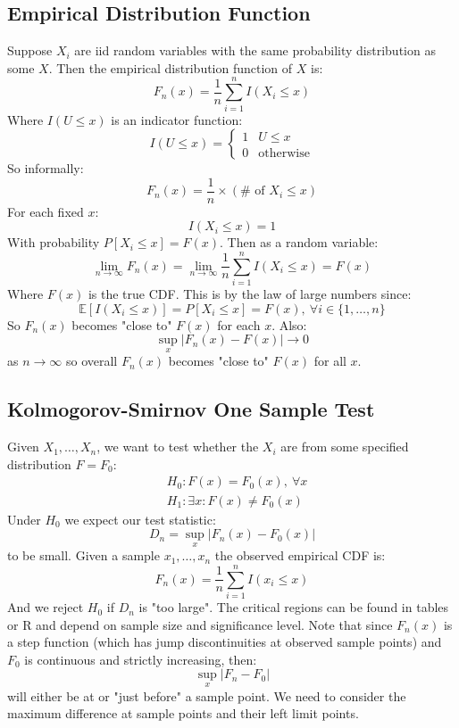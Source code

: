 \documentclass[12pt]{article}
\begin{document}
\subsection{Empirical Distribution Function}
Suppose \(X_i\) are iid random variables with the same probability distribution as some \(X\). Then the empirical distribution function of \(X\) is:
\[F_n(x)=\frac{1}{n}\sum^n_{i=1}I(X_i\leq x)\]
Where \(I(U\le x)\) is an indicator function:
\[I(U\leq x)=\begin{cases}
    1 & U\leq x \\
    0 & \text{otherwise}
\end{cases}\]
So informally:
\[F_n(x)=\frac{1}{n}\times(\# \text{ of }X_i\leq x)\]
For each fixed \(x\):
\[I(X_i\leq x)=1\]
With probability \(P[X_i\leq x]=F(x)\). Then as a random variable:
\[\lim_{n\to\infty}F_n(x)=\lim_{n\to\infty}\frac{1}{n}\sum^n_{i=1}I(X_i\leq x)=F(x)\]
Where \(F(x)\) is the true CDF. This is by the law of large numbers since:
\[\mathbb{E}[I(X_i\leq x)]=P[X_i\leq x]=F(x),\ \forall i\in\{1,\dots,n\}\]
So \(F_n(x)\) becomes "close to" \(F(x)\) for each \(x\). Also:
\[\sup_x|F_n(x)-F(x)|\to0\]
as \(n\to\infty\) so overall \(F_n(x)\) becomes "close to" \(F(x)\) for all \(x\).
\subsection{Kolmogorov-Smirnov One Sample Test}
Given \(X_1,\dots,X_n\), we want to test whether the \(X_i\) are from some specified distribution \(F=F_0\):
\begin{align*}
    &H_0:F(x)=F_0(x),\ \forall x \\
    &H_1:\exists x:F(x)\ne F_0(x)
\end{align*}
Under \(H_0\) we expect our test statistic:
\[D_n=\sup_x|F_n(x)-F_0(x)|\]
to be small. Given a sample \(x_1,\dots,x_n\) the observed empirical CDF is:
\[F_n(x)=\frac{1}{n}\sum^n_{i=1}I(x_i\leq x)\]
And we reject \(H_0\) if \(D_n\) is "too large". The critical regions can be found in tables or R and depend on sample size and significance level. Note that since \(F_n(x)\) is a step function (which has jump discontinuities at observed sample points) and \(F_0\) is continuous and strictly increasing, then:
\[\sup_x|F_n-F_0|\]
will either be at or "just before" a sample point. We need to consider the maximum difference at sample points and their left limit points.
\end{document}
